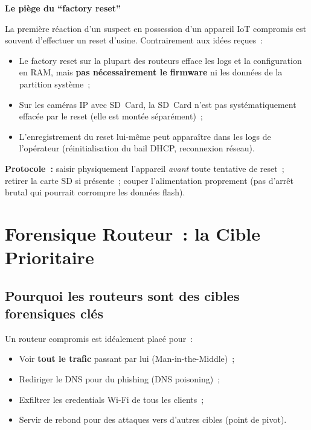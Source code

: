 \begin{boxalert}
\textbf{Le piège du ``factory reset''}

La première réaction d'un suspect en possession d'un appareil IoT
compromis est souvent d'effectuer un reset d'usine. Contrairement
aux idées reçues~:
\begin{itemize}
    \item Le factory reset sur la plupart des routeurs efface les logs
          et la configuration en RAM, mais \textbf{pas nécessairement
          le firmware} ni les données de la partition système~;
    \item Sur les caméras IP avec SD~Card, la SD~Card n'est pas
          systématiquement effacée par le reset (elle est montée
          séparément)~;
    \item L'enregistrement du reset lui-même peut apparaître dans les
          logs de l'opérateur (réinitialisation du bail DHCP,
          reconnexion réseau).
\end{itemize}
\textbf{Protocole~:} saisir physiquement l'appareil \emph{avant}
toute tentative de reset~; retirer la carte SD si présente~; couper
l'alimentation proprement (pas d'arrêt brutal qui pourrait corrompre
les données flash).
\end{boxalert}

\section{Forensique Routeur~: la Cible Prioritaire}
\label{sec:forensique-routeur}

\subsection{Pourquoi les routeurs sont des cibles forensiques clés}

Un routeur compromis est idéalement placé pour~:
\begin{itemize}
    \item Voir \textbf{tout le trafic} passant par lui (Man-in-the-Middle)~;
    \item Rediriger le DNS pour du phishing (DNS poisoning)~;
    \item Exfiltrer les credentials Wi-Fi de tous les clients~;
    \item Servir de rebond pour des attaques vers d'autres cibles
          (point de pivot).
\end{itemize}

